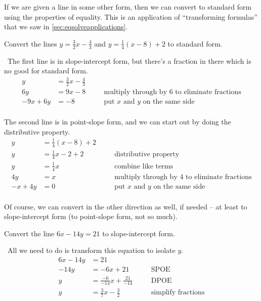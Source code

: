If we are given a line in some other form, then we can convert to standard form using the properties of equality. This is an application of ``transforming formulas'' that we saw in \cref{sec:eqsolveapplications}.

\begin{boxex}
Convert the lines $y=\frac{3}{2}x-\frac{4}{3}$ and $y=\frac{1}{4}(x-8)+2$ to standard form.

\exsoln\ The first line is in slope-intercept form, but there's a fraction in there which is no good for standard form.
\[\begin{aligned}
y &= \frac{3}{2}x-\frac{4}{3}\\
6y &= 9x-8
&& \quad\text{multiply through by 6 to eliminate fractions}\\
-9x + 6y &= -8
&& \quad\text{put $x$ and $y$ on the same side}\\
\end{aligned}\]

The second line is in point-slope form, and we can start out by doing the distributive property.
\[\begin{aligned}
y &= \frac{1}{4}(x-8)+2\\[1ex]
y &= \frac{1}{4}x-2+2
&& \quad\text{distributive property}\\[1ex]
y &= \frac{1}{4}x
&& \quad\text{combine like terms}\\[1ex]
4y &= x
&& \quad\text{multiply through by 4 to eliminate fractions}\\
-x + 4y &= 0
&& \quad\text{put $x$ and $y$ on the same side}\\
\end{aligned}\]
\end{boxex}

Of course, we can convert in the other direction as well, if needed -- at least to slope-intercept form (to point-slope form, not so much).

\begin{boxex}
Convert the line $6x - 14y = 21$ to slope-intercept form.

\exsoln\ All we need to do is transform this equation to isolate $y$.
\[\begin{aligned}
6x - 14y &= 21\\
-14y &= -6x + 21
&& \quad\text{SPOE}\\
y &= \frac{-6}{-14}x + \frac{21}{-14}
&& \quad\text{DPOE}\\
y &= \frac{3}{7}x - \frac{3}{2}
&& \quad\text{simplify fractions}\\
\end{aligned}\]
\end{boxex}

